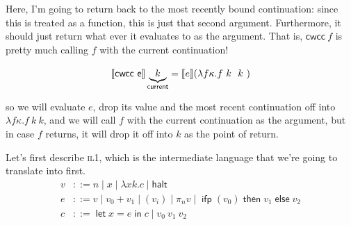 \documentclass[11pt,a4paper]{article}
\newcommand {\coo} [1] {\ensuremath{\operatorname{\mathsf{#1}}}}
\newcommand {\co} [1] {\coo{#1}}
\newcommand {\Ifp}[3] {\co{ifp} (#1) \co{then} #2 \co{else} #3}
\newcommand{\Let}[1]{\coo{let} #1 \coo{in} }
\newcommand{\f}[1]{\textsc{#1}}
\newcommand{\g}[1]{\textsf{#1}}
\newcommand{\trans}[2]{\ensuremath{\mathcal{#1}\llbracket #2\rrbracket}}
\newcommand\tmark[2]{%
  \ensuremath{\tikz[baseline] \node[anchor=base] (#1) {#2};}}
\newcommand{\tm}[2]{\tmark{#1}{\ensuremath{#2}}}
\begin{document}
\begin{enumerate}[label=\textbf{Excercise \arabic*\ }]
\begin{enumerate}
Here, I'm going to return back to the most recently bound continuation: since this is treated as a function, this is just that second argument. Furthermore, it should just return what ever it evaluates to as the argument. That is, $\g{cwcc} ~f$ is pretty much calling $f$ with the current continuation!

$$
\trans{}{\g{cwcc~e}} \underbrace{k}_{\g{current}} = \trans{}{e}(\lambda f\kappa. f\tm{1}{k}\tm{2}{k})
$$

so we will evaluate $e$, drop its value and the most recent continuation off into $\lambda f\kappa.f~k~k$, and we will call $f$ with the current continuation as the argument, but in case $f$ returns, it will drop it off into $k$ as the point of return. %

Let's first describe \f{il1}, which is the intermediate language that we're going to translate into first.
\begin{align*}
v &::= n \mid x \mid \lambda xk.c \mid \g{halt} \\
e &::= v \mid v_0 + v_1 \mid (v_i) \mid \pi_n v \mid \Ifp{v_0}{v_1}{v_2} \\
c &::= \Let{x = e}{c} \mid v_0~v_1~v_2
\end{align*}


\end{enumerate}
\end{enumerate}
\end{document}
